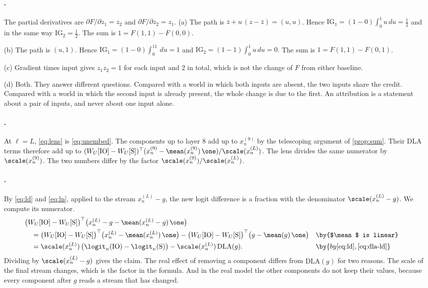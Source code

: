 {\paragraph{.}
The partial derivatives are $\partial F/\partial z_1=z_2$ and $\partial F/\partial z_2=z_1$.
(a) The path is $\bar z+u\,(z-\bar z)=(u,u)$. Hence $\mathrm{IG}_1=(1-0)\int_0^1u\,du=\tfrac12$ and in the same way
$\mathrm{IG}_2=\tfrac12$. The sum is $1=F(1,1)-F(0,0)$.

(b) The path is $(u,1)$. Hence $\mathrm{IG}_1=(1-0)\int_0^11\,du=1$ and $\mathrm{IG}_2=(1-1)\int_0^1u\,du=0$. The sum is
$1=F(1,1)-F(0,1)$.

(c) Gradient times input gives $z_1z_2=1$ for each input and $2$ in total, which is not the change of $F$ from
either baseline.

(d) Both. They answer different questions. Compared with a world in which both inputs are absent, the two inputs
share the credit. Compared with a world in which the second input is already present, the whole change is due to
the first. An attribution is a statement about a pair of inputs, and never about one input alone.

\paragraph{.}
At $\ell=L$, \eqref{eq:lens} is \eqref{eq:unembed}. The components up to layer 8 add up to $x_n^{(9)}$ by the
telescoping argument of \cref{prop:sum}. Their DLA terms therefore add up to
$(W_U[\mathrm{IO}]-W_U[\mathrm{S}])^\top(x_n^{(9)}-\mean(x_n^{(9)})\,\one)/\scale(x_n^{(L)})$. The lens divides the same
numerator by $\scale(x_n^{(9)})$. The two numbers differ by the factor $\scale(x_n^{(9)})/\scale(x_n^{(L)})$.

\paragraph{.}
By \eqref{eq:ld} and \eqref{eq:ln}, applied to the stream $x_n^{(L)}-g$, the new logit difference is a fraction
with the denominator $\scale(x_n^{(L)}-g)$. We compute its numerator.
\begin{align*}
&\big(W_U[\mathrm{IO}]-W_U[\mathrm{S}]\big)^\top\big(x_n^{(L)}-g-\mean(x_n^{(L)}-g)\,\one\big)\\
&\quad= \big(W_U[\mathrm{IO}]-W_U[\mathrm{S}]\big)^\top\big(x_n^{(L)}-\mean(x_n^{(L)})\,\one\big)
-\big(W_U[\mathrm{IO}]-W_U[\mathrm{S}]\big)^\top\big(g-\mean(g)\,\one\big) && \by{$\mean$ is linear}\\
&\quad= \scale(x_n^{(L)})\,\big(\logit_n(\mathrm{IO})-\logit_n(\mathrm{S})\big)-\scale(x_n^{(L)})\,\mathrm{DLA}(g). && \by{by \eqref{eq:ld}, \eqref{eq:dla-ld}}
\end{align*}
Dividing by $\scale(x_n^{(L)}-g)$ gives the claim. The real effect of removing a component differs from $\mathrm{DLA}(g)$ for two reasons. The
scale of the final stream changes, which is the factor in the formula. And in the real model the other components
do not keep their values, because every component after $g$ reads a stream that has changed.

}
